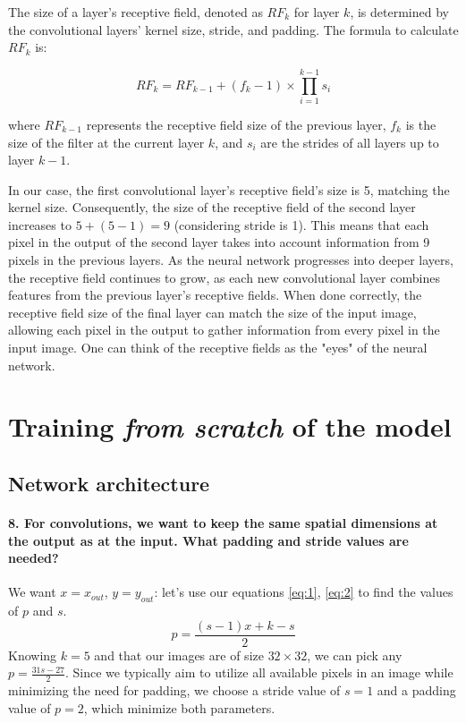 The size of a layer's receptive field, denoted as $RF_k$ for layer $k$, is determined by the convolutional layers' kernel size, stride, and padding. The formula to calculate $RF_k$ is:

\[ RF_k = RF_{k-1} + (f_k - 1) \times \prod_{i=1}^{k-1}s_i \]

where $ RF_{k-1} $ represents the receptive field size of the previous layer, $ f_k $ is the size of the filter at the current layer $ k $, and $ s_i $ are the strides of all layers up to layer $ k-1 $.

In our case, the first convolutional layer's receptive field's size is 5, matching the kernel size. Consequently, the size of the receptive field of the second layer increases to $ 5 + (5 - 1) = 9 $ (considering stride is 1). This means that each pixel in the output of the second layer takes into account information from 9 pixels in the previous layers. As the neural network progresses into deeper layers, the receptive field continues to grow, as each new convolutional layer combines features from the previous layer's receptive fields. When done correctly, the receptive field size of the final layer can match the size of the input image, allowing each pixel in the output to gather information from every pixel in the input image. One can think of the receptive fields as the "eyes" of the neural network.


\section{Training \textit{from scratch} of the model}
\subsection{Network architecture}
\paragraph{8. For convolutions, we want to keep the same spatial dimensions at the output as at the input. What padding and stride values are needed?}
We want $ x = x_{out}$, $ y = y_{out} $: let's use our equations \ref{eq:1}, \ref{eq:2} to find the values of $p$ and $s$.
\[
    p = \frac{(s-1)x + k - s}{2}
\]
Knowing $k = 5$ and that our images are of size $32 \times 32 $, we can pick any $p = \frac{31s - 27}{2}$. Since we typically aim to utilize all available pixels in an image while minimizing the need for padding, we choose a stride value of $ s = 1 $ and a padding value of $ p = 2 $, which minimize both parameters.


